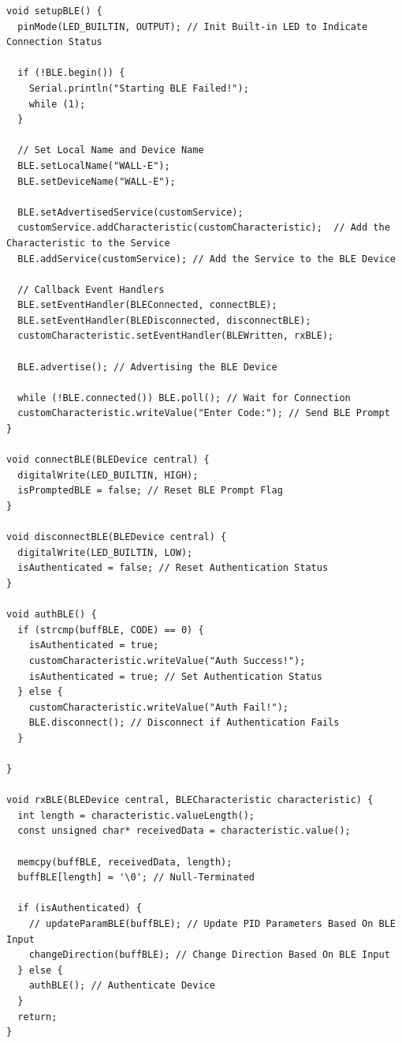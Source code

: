 \documentclass{article}
\begin{document}
\begin{lstlisting}[caption={Source Code : Arduino BLE Functionality}, label={lst:arduino_ble_code}]
void setupBLE() {
  pinMode(LED_BUILTIN, OUTPUT); // Init Built-in LED to Indicate Connection Status

  if (!BLE.begin()) {
    Serial.println("Starting BLE Failed!");
    while (1);
  }

  // Set Local Name and Device Name
  BLE.setLocalName("WALL-E");
  BLE.setDeviceName("WALL-E");

  BLE.setAdvertisedService(customService);
  customService.addCharacteristic(customCharacteristic);  // Add the Characteristic to the Service
  BLE.addService(customService); // Add the Service to the BLE Device

  // Callback Event Handlers
  BLE.setEventHandler(BLEConnected, connectBLE);
  BLE.setEventHandler(BLEDisconnected, disconnectBLE);
  customCharacteristic.setEventHandler(BLEWritten, rxBLE);

  BLE.advertise(); // Advertising the BLE Device

  while (!BLE.connected()) BLE.poll(); // Wait for Connection
  customCharacteristic.writeValue("Enter Code:"); // Send BLE Prompt
}

void connectBLE(BLEDevice central) {
  digitalWrite(LED_BUILTIN, HIGH);
  isPromptedBLE = false; // Reset BLE Prompt Flag
}

void disconnectBLE(BLEDevice central) {
  digitalWrite(LED_BUILTIN, LOW);
  isAuthenticated = false; // Reset Authentication Status
}

void authBLE() {
  if (strcmp(buffBLE, CODE) == 0) {
    isAuthenticated = true;
    customCharacteristic.writeValue("Auth Success!");
    isAuthenticated = true; // Set Authentication Status
  } else {
    customCharacteristic.writeValue("Auth Fail!");
    BLE.disconnect(); // Disconnect if Authentication Fails
  }

}

void rxBLE(BLEDevice central, BLECharacteristic characteristic) {
  int length = characteristic.valueLength();
  const unsigned char* receivedData = characteristic.value();

  memcpy(buffBLE, receivedData, length);
  buffBLE[length] = '\0'; // Null-Terminated

  if (isAuthenticated) {
    // updateParamBLE(buffBLE); // Update PID Parameters Based On BLE Input
    changeDirection(buffBLE); // Change Direction Based On BLE Input
  } else {
    authBLE(); // Authenticate Device
  }
  return;
}
\end{lstlisting}
\end{document}
